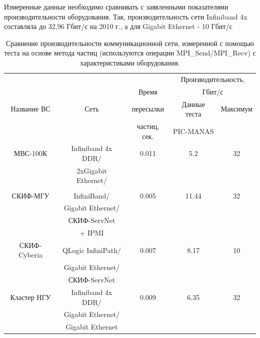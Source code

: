 Измеренные данные необходимо сравнивать с заявленными показателями производительности оборудования. Так, производительность сети Infiniband 4x составляла до 32.96 Гбит/с на 2010 г.,  а для Gigabit Ethernet - 10 Гбит/с  

\begin{table}[ht]
	\caption{Сравнение производительности коммуникационной сети, измеренной с помощью теста на основе метода частиц (используются операции MPI\_Send/MPI\_Recv) с характеристиками оборудования.}
	\label{tab_net_gb_sec}
	\begin{tabular}{|c|c|c|c|c|}
		\hline
		             &                     &        &    \multicolumn{2}{|c|}{Производительность,} \\ 
		             &                     & Время            &    \multicolumn{2}{|c|}{Гбит/с} \\ \cline{4-5}              
		Название ВС  & Сеть                & пересылки   & Данные теста       & Максимум  \\
		             &                     & частиц, сек.&   PIC-MANAS        &           \\  \hline
		МВС-100К     &  Infiniband 4x DDR/ &  0.011           &     5.2           & 32       \\ 
		             &  2xGigabit Ethernet/&             &                    &          \\
		             &                     &             &                    &          \\ \hline  
		СКИФ-МГУ     & InfiniBand/         &  0.005           &     11.44          & 32       \\   
		             &  Gigabit Ethernet/  &              &                    &          \\
		             &  СКИФ-ServNet       &              &                    &          \\   
		             &   + IPMI            &             &                     &          \\ \hline  
		СКИФ-Cyberia &  QLogic InfiniPath/ &  0.007           &      8.17              & 10    \\ 
		             &  Gigabit Ethernet/  &             &                    &          \\
		             &  СКИФ-ServNet       &             &                    &          \\ \hline
		Кластер НГУ  & Infiniband 4x DDR/  &  0.009        &     6.35           & 32       \\ 
		             &   Gigabit Ethernet/ &           &                    &          \\
		             &   Gigabit Ethernet  &           &                    &          \\ \hline
	\end{tabular}	
\end{table}

